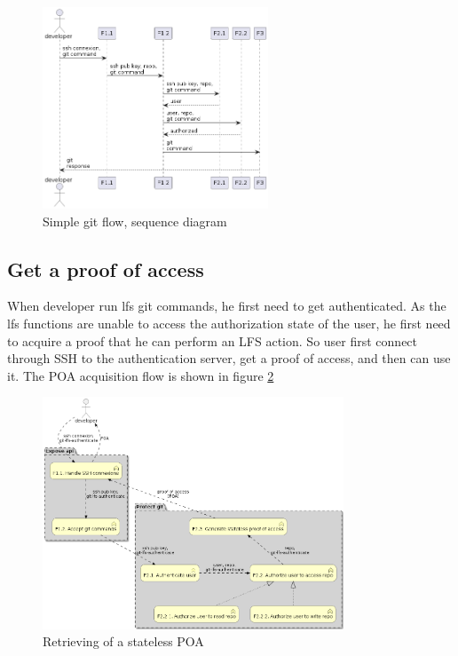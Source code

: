 \begin{figure}[H]
    \centering
    \includegraphics[width=0.6\textwidth]{design/diagrams/simple_git_flow_sequence.png}
    \caption{Simple git flow, sequence diagram}
    \label{fig:simple_git_flow_sequence}
\end{figure}

\subsection{Get a proof of access}

When developer run lfs git commands, he first need to get authenticated. As the lfs functions are unable to access the authorization state of the user, he first need to acquire a proof that he can perform an LFS action. So user first connect through SSH to the authentication server, get a proof of access, and then can use it. The POA acquisition flow is shown in figure \ref{fig:poa_flow}

\begin{figure}[H]
    \centering
    \includegraphics[width=0.8\textwidth]{design/diagrams/POA_flow.png}
    \caption{Retrieving of a stateless POA}
    \label{fig:poa_flow}
\end{figure}

